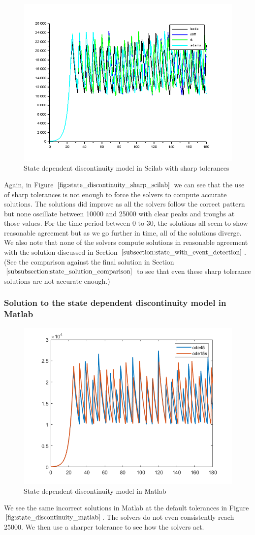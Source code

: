 \begin{figure}[H]
\centering
\includegraphics[width=0.7\linewidth]{./figures/state_discontinuity_sharp_sci}
\caption{State dependent discontinuity model in Scilab with sharp tolerances}
\label{fig:state_discontinuity_sharp_scilab}
\end{figure}

Again, in Figure $\ref{fig:state_discontinuity_sharp_scilab}$ we can see that the use of sharp tolerances is not enough to force the solvers to compute accurate solutions. The solutions did improve as all the solvers follow the correct pattern but none oscillate between 10000 and 25000 with clear peaks and troughs at those values. For the time period between 0 to 30, the solutions all seem to show reasonable agreement but as we go further in time, all of the solutions diverge. We also note that none of the solvers compute solutions in reasonable agreement with the solution discussed in Section $\ref{subsection:state_with_event_detection}$. (See the comparison against the final solution in Section $\ref{subsubsection:state_solution_comparison}$ to see that even these sharp tolerance solutions are not accurate enough.)


\subsubsection{Solution to the state dependent discontinuity model in Matlab}
\begin{figure}[H]
\centering
\includegraphics[width=0.7\linewidth]{./figures/state_discontinuity_matlab}
\caption{State dependent discontinuity model in Matlab}
\label{fig:state_discontinuity_matlab}
\end{figure}
We see the same incorrect solutions in Matlab at the default tolerances in Figure $\ref{fig:state_discontinuity_matlab}$. The solvers do not even consistently reach 25000. We then use a sharper tolerance to see how the solvers act.

